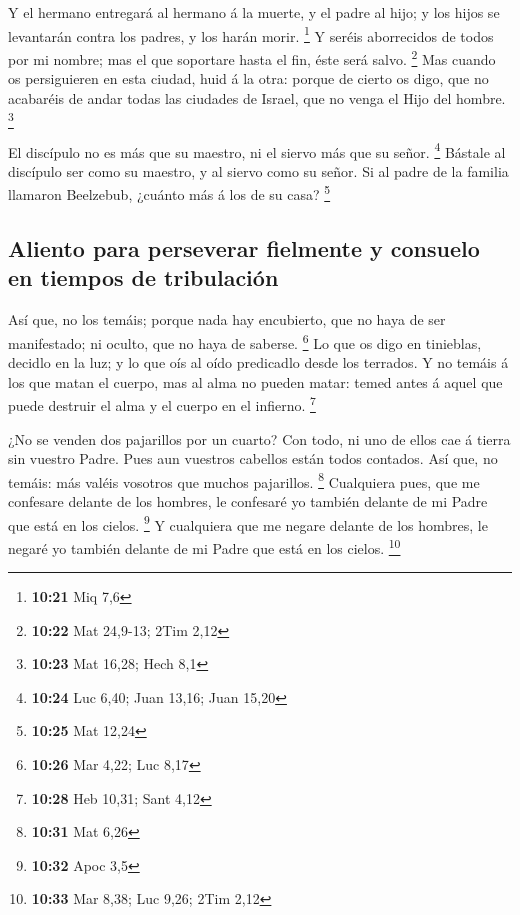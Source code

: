  Y el hermano entregará al hermano á la muerte, y el
padre al hijo; y los hijos se levantarán contra los padres, y los harán
morir. \footnote{\textbf{10:21} Miq 7,6}  Y seréis
aborrecidos de todos por mi nombre; mas el que soportare hasta el fin,
éste será salvo. \footnote{\textbf{10:22} Mat 24,9-13; 2Tim 2,12}
 Mas cuando os persiguieren en esta ciudad, huid á la
otra: porque de cierto os digo, que no acabaréis de andar todas las
ciudades de Israel, que no venga el Hijo del hombre. \footnote{\textbf{10:23}
  Mat 16,28; Hech 8,1}

 El discípulo no es más que su maestro, ni el siervo más
que su señor. \footnote{\textbf{10:24} Luc 6,40; Juan 13,16; Juan 15,20}
 Bástale al discípulo ser como su maestro, y al siervo
como su señor. Si al padre de la familia llamaron Beelzebub, ¿cuánto más
á los de su casa? \footnote{\textbf{10:25} Mat 12,24}

\hypertarget{aliento-para-perseverar-fielmente-y-consuelo-en-tiempos-de-tribulaciuxf3n}{%
\subsection{Aliento para perseverar fielmente y consuelo en tiempos de
tribulación}\label{aliento-para-perseverar-fielmente-y-consuelo-en-tiempos-de-tribulaciuxf3n}}

 Así que, no los temáis; porque nada hay encubierto, que
no haya de ser manifestado; ni oculto, que no haya de saberse.
\footnote{\textbf{10:26} Mar 4,22; Luc 8,17}  Lo que os
digo en tinieblas, decidlo en la luz; y lo que oís al oído predicadlo
desde los terrados.  Y no temáis á los que matan el
cuerpo, mas al alma no pueden matar: temed antes á aquel que puede
destruir el alma y el cuerpo en el infierno. \footnote{\textbf{10:28}
  Heb 10,31; Sant 4,12}

 ¿No se venden dos pajarillos por un cuarto? Con todo, ni
uno de ellos cae á tierra sin vuestro Padre.  Pues aun
vuestros cabellos están todos contados.  Así que, no
temáis: más valéis vosotros que muchos pajarillos. \footnote{\textbf{10:31}
  Mat 6,26}  Cualquiera pues, que me confesare delante de
los hombres, le confesaré yo también delante de mi Padre que está en los
cielos. \footnote{\textbf{10:32} Apoc 3,5}  Y cualquiera
que me negare delante de los hombres, le negaré yo también delante de mi
Padre que está en los cielos. \footnote{\textbf{10:33} Mar 8,38; Luc
  9,26; 2Tim 2,12}

